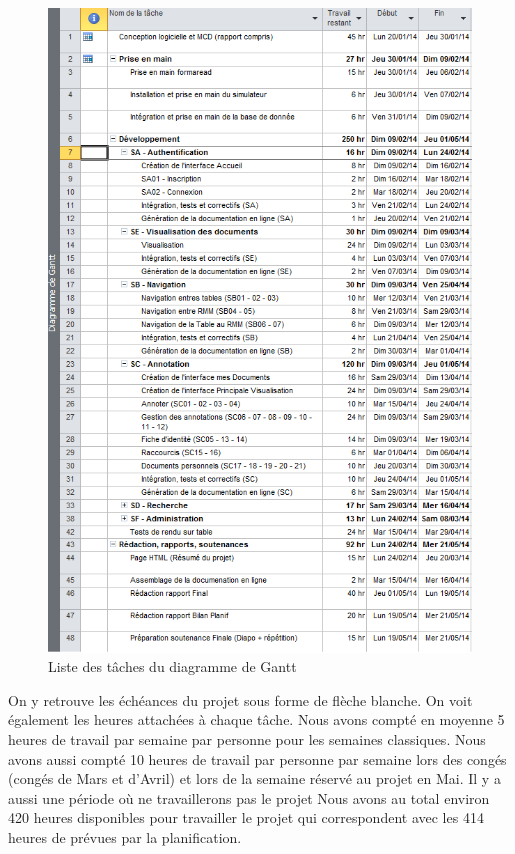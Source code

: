 \documentclass[a4paper]{article}
\begin{document}
\begin{figure}[H]
\centering
\includegraphics[width=\textwidth]{taches_gantt.png}
\caption{Liste des tâches du diagramme de Gantt}
\label{fig:taches_gantt}
\end{figure}

	On y retrouve les échéances du projet sous forme de flèche blanche. On voit également les heures attachées à chaque tâche. Nous avons compté en moyenne 5 heures de travail par semaine par personne pour les semaines classiques. Nous avons aussi compté 10 heures de travail par personne par semaine lors des congés (congés de Mars et d'Avril) et lors de la semaine réservé au projet en Mai. Il y a aussi une période où ne travaillerons pas le projet  Nous avons au total environ 420 heures disponibles pour travailler le projet qui correspondent avec les 414 heures de prévues par la planification.\\
\end{document}
